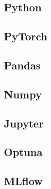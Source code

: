 \documentclass[../main.tex]{subfiles}
\begin{document}
\subsection{Python}

\subsection{PyTorch}

\subsection{Pandas}

\subsection{Numpy}

\subsection{Jupyter}

\subsection{Optuna}

\subsection{MLflow}
\end{document}
